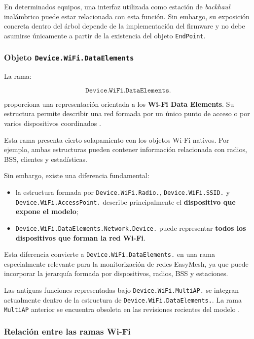 En determinados equipos, una interfaz utilizada como estación de
\textit{backhaul} inalámbrico puede estar relacionada con esta función.
Sin embargo, su exposición concreta dentro del árbol depende de la
implementación del firmware y no debe asumirse únicamente a partir de la
existencia del objeto \texttt{EndPoint}.


\subsubsection*{Objeto \texttt{Device.WiFi.DataElements}}

La rama:

\[
    \texttt{Device.WiFi.DataElements.}
\]

proporciona una representación orientada a los
\textbf{Wi-Fi Data Elements}. Su estructura permite describir una red
formada por un único punto de acceso o por varios dispositivos
coordinados \cite{bbf_tr181}.

Esta rama presenta cierto solapamiento con los objetos Wi-Fi nativos. Por
ejemplo, ambas estructuras pueden contener información relacionada con
radios, BSS, clientes y estadísticas.

Sin embargo, existe una diferencia fundamental:

\begin{itemize}
    \item la estructura formada por
    \texttt{Device.WiFi.Radio.},
    \texttt{Device.WiFi.SSID.} y
    \texttt{Device.WiFi.AccessPoint.} describe principalmente el
    \textbf{dispositivo que expone el modelo};

    \item \texttt{Device.WiFi.DataElements.Network.Device.} puede
    representar \textbf{todos los dispositivos que forman la red
    Wi-Fi}.
\end{itemize}

Esta diferencia convierte a \texttt{Device.WiFi.DataElements.} en una
rama especialmente relevante para la monitorización de redes EasyMesh,
ya que puede incorporar la jerarquía formada por dispositivos, radios,
BSS y estaciones.

Las antiguas funciones representadas bajo
\texttt{Device.WiFi.MultiAP.} se integran actualmente dentro de la
estructura de \texttt{Device.WiFi.DataElements.}. La rama
\texttt{MultiAP} anterior se encuentra obsoleta en las revisiones
recientes del modelo \cite{bbf_tr181}.


\subsubsection*{Relación entre las ramas Wi-Fi}

